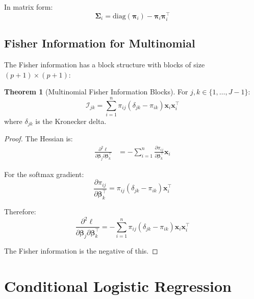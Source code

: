\documentclass[11pt,letterpaper]{article}
\theoremstyle{definition}
\newtheorem{theorem}{Theorem}[section]
\newcommand{\bb}{\boldsymbol{\beta}}
\newcommand{\pp}{\boldsymbol{\pi}}
\newcommand{\I}{\mathcal{I}}
\newcommand{\diag}{\mathrm{diag}}
\begin{document}
In matrix form:
\begin{equation}
    \boldsymbol{\Sigma}_i = \diag(\pp_i) - \pp_i\pp_i^\top
\end{equation}

\subsection{Fisher Information for Multinomial}

The Fisher information has a block structure with blocks of size $(p+1) \times (p+1)$:

\begin{theorem}[Multinomial Fisher Information Blocks]
For $j, k \in \{1, \ldots, J-1\}$:
\begin{equation}
    \I_{jk} = \sum_{i=1}^{n} \pi_{ij}(\delta_{jk} - \pi_{ik}) \mathbf{x}_i \mathbf{x}_i^\top
    \label{eq:multinom-fisher}
\end{equation}
where $\delta_{jk}$ is the Kronecker delta.
\end{theorem}

\begin{proof}
The Hessian is:
\begin{align}
    \frac{\partial^2 \ell}{\partial \bb_j \partial \bb_k^\top} &= -\sum_{i=1}^{n} \frac{\partial \pi_{ij}}{\partial \bb_k^\top} \mathbf{x}_i
\end{align}

For the softmax gradient:
\begin{equation}
    \frac{\partial \pi_{ij}}{\partial \bb_k^\top} = \pi_{ij}(\delta_{jk} - \pi_{ik}) \mathbf{x}_i^\top
\end{equation}

Therefore:
\begin{equation}
    \frac{\partial^2 \ell}{\partial \bb_j \partial \bb_k^\top} = -\sum_{i=1}^{n} \pi_{ij}(\delta_{jk} - \pi_{ik}) \mathbf{x}_i \mathbf{x}_i^\top
\end{equation}

The Fisher information is the negative of this.
\end{proof}

\section{Conditional Logistic Regression}
\end{document}
